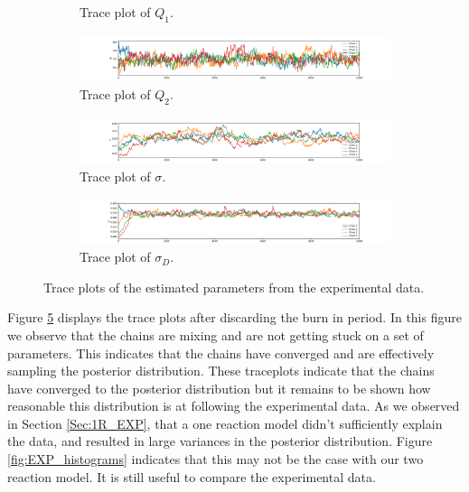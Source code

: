 \begin{figure}[h!]
\begin{subfigure}{\textwidth}
  \caption{Trace plot of $Q_{1}$.}
  \label{fig:subtpburnTm1}
\end{subfigure}%
\newline
\begin{subfigure}{\textwidth}
  \centering
  \includegraphics[width=\linewidth]{figures/bayesian/EXP_Q/trace_plot_Q2_burned.pdf}
  \caption{Trace plot of $Q_{2}$.}
  \label{fig:subtpburnTm2}
\end{subfigure}
\newline
\begin{subfigure}{\textwidth}
  \centering
  \includegraphics[width=\linewidth]{figures/bayesian/EXP_Q/trace_plot_sigma_burned.pdf}
  \caption{Trace plot of $\sigma$.}
  \label{fig:subtpburnsigma}
\end{subfigure}%
\newline
\begin{subfigure}{\textwidth}
  \centering
  \includegraphics[width=\linewidth]{figures/bayesian/EXP_Q/trace_plot_sigmaD_burned.pdf}
  \caption{Trace plot of $\sigma_D$.}
  \label{fig:subburnsigmad}
\end{subfigure}
    \caption{Trace plots of the estimated parameters from the experimental data.}%
    \label{fig:EXP_TP_burned}%
\end{figure}%

Figure \ref{fig:EXP_TP_burned} displays the trace plots after discarding the burn in period. In this figure we observe that the chains are mixing and are not getting stuck on a set of parameters. This indicates that the chains have converged and are effectively sampling the posterior distribution. These traceplots indicate that the chains have converged to the posterior distribution but it remains to be shown how reasonable this distribution is at following the experimental data. As we observed in Section \ref{Sec:1R_EXP}, that a one reaction model didn't sufficiently explain the data, and resulted in large variances in the posterior distribution. Figure \ref{fig:EXP_histograms} indicates that this may not be the case with our two reaction model. It is still useful to compare the experimental data.\\

